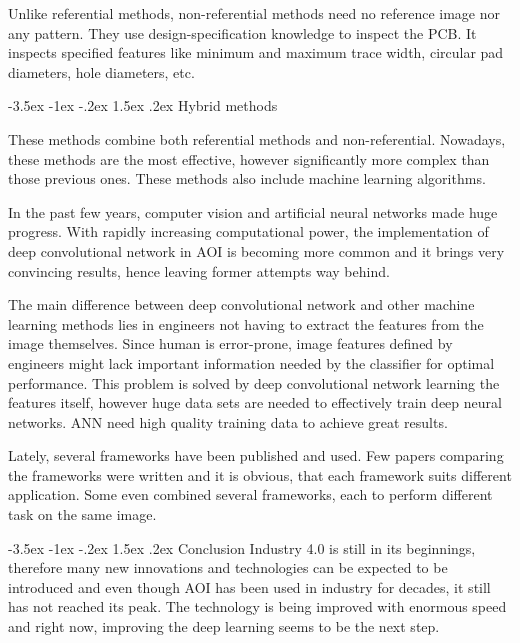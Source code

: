 \documentclass[a4paper,10pt]{article}
\makeatletter
\theoremstyle{definition}
\renewcommand\section{\@startsection {section}{1}{\z@}%
	{-3.5ex \@plus -1ex \@minus -.2ex}%
	{1.5ex \@plus.2ex}%
	{\large\bfseries}}
\renewcommand\subsection{\@startsection {subsection}{1}{\z@}%
	{-3.5ex \@plus -1ex \@minus -.2ex}%
	{1.5ex \@plus.2ex}%
	{\normalsize\bfseries}}
\makeatother
\begin{document}
	Unlike referential methods, non-referential methods need no reference image nor any pattern. They use design-specification knowledge to inspect the PCB. It inspects specified features like minimum and maximum trace width, circular pad diameters, hole diameters, etc. \cite{moganti_ercal}\cite{taha_emary}
	
	\subsection{Hybrid methods}
	\label{subsec:3}
	
	These methods combine both referential methods and non-referential. Nowadays, these methods are the most effective, however significantly more complex than those previous ones. These methods also include machine learning algorithms.\cite{taha_emary}
	
	In the past few years, computer vision and artificial neural networks made huge progress. With rapidly increasing computational power, the implementation of deep convolutional network in AOI is becoming more common and it brings very convincing results, hence leaving former attempts way behind.
	
	The main difference between deep convolutional network and other machine learning methods lies in engineers not having to extract the features from the image themselves. Since human is error-prone, image features defined by engineers might lack important information needed by the classifier for optimal performance. This problem is solved by deep convolutional network learning the features itself, however huge data sets are needed to effectively train deep neural networks. ANN need high quality training data to achieve great results. \cite{richter_streitferdt}
	
	Lately, several frameworks have been published and used. Few papers comparing the frameworks were written and it is obvious, that each framework suits different application. Some even combined several frameworks, each to perform different task on the same image. \cite{richter_streitferdt}\cite{li_kuo}
	
	\section{Conclusion}
	\label{sec:6}
	Industry 4.0 is still in its beginnings, therefore many new innovations and technologies can be expected to be introduced and even though AOI has been used in industry for decades, it still has not reached its peak. The technology is being improved with enormous speed and right now, improving the deep learning seems to be the next step. 
	
	\begingroup
	\makeatletter
	\renewcommand\section{\@startsection {section}{1}{\z@}%
		{-3.5ex \@plus -1ex \@minus -.2ex}%
		{4.5ex \@plus.2ex}%
		{\large\bfseries}}
	\makeatother
	
	
	{}
	
	\endgroup
	
\end{document}
